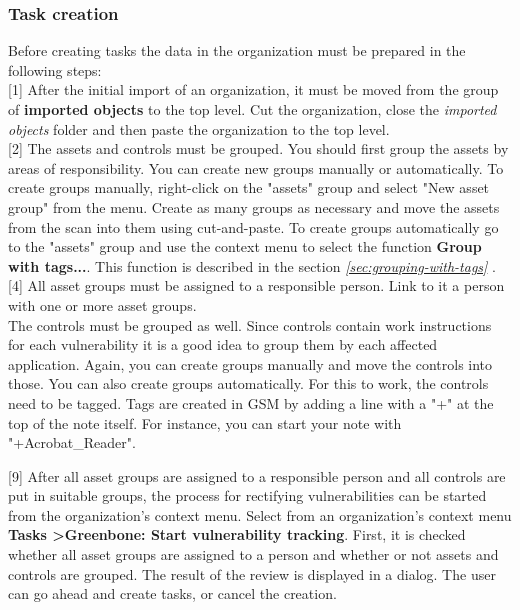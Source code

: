 \documentclass[a4paper,10pt]{book}
\begin{document}
\subsubsection{Task creation}
Before creating tasks the data in the organization must be prepared in the following steps:
\newline\\
{[}1{]} After the initial import of an organization, it must be moved from the group of \textbf{imported objects} to the top level. Cut the organization, close the {\em imported objects} folder and then paste the organization to the top level.
\newline\\
{[}2{]} The assets and controls must be grouped.
You should first group the assets by areas of responsibility. You can create new groups manually or automatically. To create groups manually, right-click on the "assets" group and select "New asset group" from the menu. Create as many groups as necessary and move the assets from the scan into them using cut-and-paste.
To create groups automatically go to the "assets" group and use the context menu to select the function \textbf{Group with tags...}.
This function is described in the section {\em \ref{sec:grouping-with-tags} }.
\newline\\
{[}4{]} All asset groups must be assigned to a responsible person. Link to it a person with one or more asset groups.
\newline\\
The controls must be grouped as well. Since controls contain work instructions for each vulnerability it is a good idea to group them by each affected application. Again, you can create groups manually and move the controls into those. You can also create groups automatically. For this to work, the controls need to be tagged. Tags are created in GSM by adding a line with a "+" at the top of the note itself. For instance, you can start your note with "+Acrobat\_Reader".

{[}9{]} After all asset groups are assigned to a responsible person and all controls are put in suitable groups, the process for rectifying vulnerabilities can be started from the organization’s context menu. Select from an organization's context menu \textbf{Tasks \textgreater Greenbone: Start vulnerability tracking}. First, it is checked whether all asset groups are assigned to a person and whether or not assets and controls are grouped. The result of the review is displayed in a dialog. The user can go ahead and create tasks, or cancel the creation.
\end{document}
